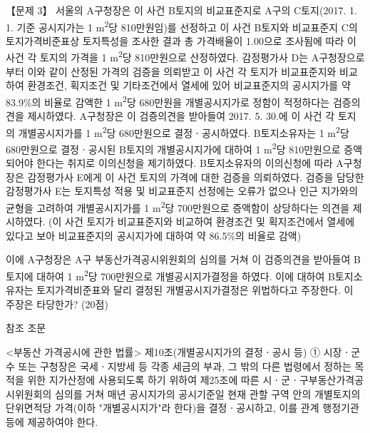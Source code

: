 \begin{longquestion}{【문제 3】}
서울의 A구청장은 이 사건 B토지의 비교표준지로 A구의 C토지(2017. 1. 1. 기준 공시지가는 1 m\textsuperscript{2}당 810만원임)를 선정하고 이 사건 B토지와 비교표준지 C의 토지가격비준표상 토지특성을 조사한 결과 총 가격배율이 1.00으로 조사됨에 따라 이 사건 각 토지의 가격을 1 m\textsuperscript{2}당 810만원으로 산정하였다. 감정평가사 D는 A구청장으로부터 이와 같이 산정된 가격의 검증을 의뢰받고 이 사건 각 토지가 비교표준지와 비교하여 환경조건, 획지조건 및 기타조건에서 열세에 있어 비교표준지의 공시지가를 약 83.9\%의 비율로 감액한 1 m\textsuperscript{2}당 680만원을 개별공시지가로 정함이 적정하다는 검증의견을 제시하였다. A구청장은 이 검증의견을 받아들여 2017. 5. 30.에 이 사건 각 토지의 개별공시지가를 1 m\textsuperscript{2}당 680만원으로 결정ㆍ공시하였다. B토지소유자는 1 m\textsuperscript{2}당 680만원으로 결정ㆍ공시된 B토지의 개별공시지가에 대하여 1 m\textsuperscript{2}당 810만원으로 증액되어야 한다는 취지로 이의신청을 제기하였다. B토지소유자의 이의신청에 따라 A구청장은 감정평가사 E에게 이 사건 토지의 가격에 대한 검증을 의뢰하였다. 검증을 담당한 감정평가사 E는 토지특성 적용 및 비교표준지 선정에는 오류가 없으나 인근 지가와의 균형을 고려하여 개별공시지가를 1 m\textsuperscript{2}당 700만원으로 증액함이 상당하다는 의견을 제시하였다. (이 사건 토지가 비교표준지와 비교하여 환경조건 및 획지조건에서 열세에 있다고 보아 비교표준지의 공시지가에 대하여 약 86.5\%의 비율로 감액) \par
이에 A구청장은 A구 부동산가격공시위원회의 심의를 거쳐 이 검증의견을 받아들여 B토지에 대하여 1 m\textsuperscript{2}당 700만원으로 개별공시지가결정을 하였다. 이에 대하여 B토지소유자는 토지가격비준표와 달리 결정된 개별공시지가결정은 위법하다고 주장한다. 이 주장은 타당한가? (20점) \par
\begin{framedtext}
참조 조문 \par
<부동산 가격공시에 관한 법률> 
제10조(개별공시지가의 결정ㆍ공시 등) ① 시장ㆍ군수 또는 구청장은 국세ㆍ지방세 등 각종 세금의 부과, 그 밖의 다른 법령에서 정하는 목적을 위한 지가산정에 사용되도록 하기 위하여 
제25조에 따른 시ㆍ군ㆍ구부동산가격공시위원회의 심의를 거쳐 매년 공시지가의 공시기준일 현재 관할 구역 안의 개별토지의 단위면적당 가격(이하 "개별공시지가"라 한다)을 결정ㆍ공시하고, 이를 관계 행정기관 등에 제공하여야 한다. 

\end{framedtext}
\end{longquestion}
